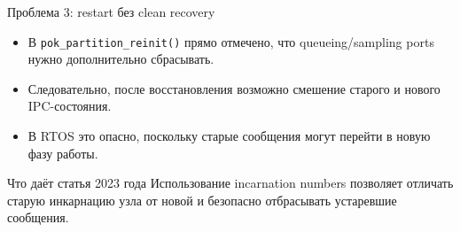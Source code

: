 \begin{frame}{Проблема 3: restart без clean recovery}
	\begin{itemize}
		\item В \texttt{pok\_partition\_reinit()} прямо отмечено, что queueing/sampling ports нужно дополнительно сбрасывать.
		\item Следовательно, после восстановления возможно смешение старого и нового IPC-состояния.
		\item В RTOS это опасно, поскольку старые сообщения могут перейти в новую фазу работы.
	\end{itemize}
	
	\vspace{0.3cm}
	
	\begin{block}{Что даёт статья 2023 года}
		Использование incarnation numbers позволяет отличать старую инкарнацию узла от новой и безопасно отбрасывать устаревшие сообщения.
	\end{block}
\end{frame}